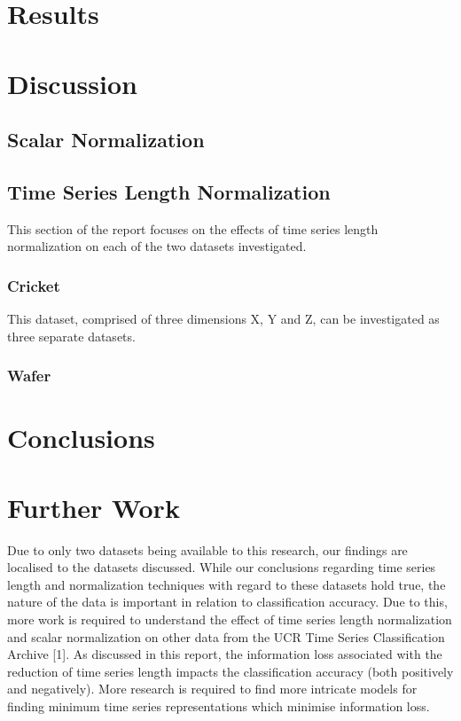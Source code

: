 \documentclass[10pt,a4paper]{article}
\begin{document}
\section{Results}



\section{Discussion}

\subsection{Scalar Normalization}



\subsection{Time Series Length Normalization}
This section of the report focuses on the effects of time series length normalization on each of the two datasets investigated.

\subsubsection{Cricket}

This dataset, comprised of three dimensions X, Y and Z, can be investigated as three separate datasets.

\subsubsection{Wafer}



\section{Conclusions}

\section{Further Work}

Due to only two datasets being available to this research, our findings are localised to the datasets discussed.
While our conclusions regarding time series length and normalization techniques with regard to these datasets hold true, the nature of the data is important in relation to classification accuracy.
Due to this, more work is required to understand the effect of time series length normalization and scalar normalization on other data from the UCR Time Series Classification Archive [1]. 
As discussed in this report, the information loss associated with the reduction of time series length impacts the classification accuracy (both positively and negatively).
More research is required to find more intricate models for finding minimum time series representations which minimise information loss.
\end{document}
